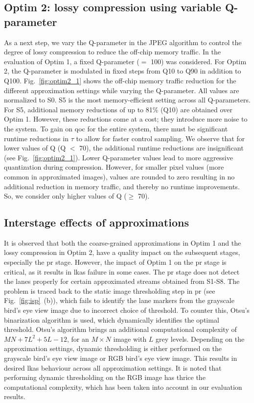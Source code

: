 \subsection{Optim 2: lossy compression using variable Q-parameter}\label{ss_optim2}
\par As a next step, we vary the Q-parameter in the JPEG algorithm to control the degree of lossy compression to reduce the off-chip memory traffic. In the evaluation of Optim 1, a fixed Q-parameter ($=$ 100) was considered. For Optim 2, the Q-parameter is modulated in fixed steps from Q10 to Q90 in addition to Q100. Fig.\ \ref{fig:optim2_1} shows the off-chip memory traffic reduction for the different approximation settings while varying the Q-parameter. All values are normalized to S0. S5 is the most memory-efficient setting across all Q-parameters. For S5, additional memory reductions of up to 81\% (Q10) are obtained over Optim 1. However, these reductions come at a cost; they introduce more noise to the system. To gain on \gls{qoc} for the entire system, there must be significant runtime reductions in $\tau$ to allow for faster control sampling. We observe that for lower values of Q (Q $<$ 70), the additional runtime reductions are insignificant (see Fig.\ \ref{fig:optim2_1}). Lower Q-parameter values lead to more aggressive quantization during compression. However, for smaller pixel values (more common in approximated images), values are rounded to zero resulting in no additional reduction in memory traffic, and thereby no runtime improvements. So, we consider only higher values of Q ($\geq$ 70).

\subsection{Interstage effects of approximations}\label{sub_stages}
It is observed that both the coarse-grained approximations in Optim 1 and the lossy compression in Optim 2, have a quality impact on the subsequent stages, especially the \gls{pr} stage. However, the impact of Optim 1 on the \gls{pr} stage is critical, as it results in \gls{lkas} failure in some cases. The \gls{pr} stage does not detect the lanes properly for certain approximated streams obtained from S1-S8. The problem is traced back to the static image thresholding step in \gls{pr} (see Fig.~\ref{fig:isp}~(b)), which fails to identify the lane markers from the grayscale bird's eye view image due to incorrect choice of threshold. To counter this, Otsu's binarization algorithm is used, which dynamically identifies the optimal threshold. Otsu's algorithm brings an additional computational complexity of $MN + 7L^2+5L-12$, for an $M \times N$ image with $L$ grey levels. Depending on the approximation settings, dynamic thresholding is either performed on the grayscale bird's eye view image or RGB bird's eye view image. This results in desired \gls{lkas} behaviour across all approximation settings. It is noted that performing dynamic thresholding on the RGB image has thrice the computational complexity, which has been taken into account in our evaluation results.